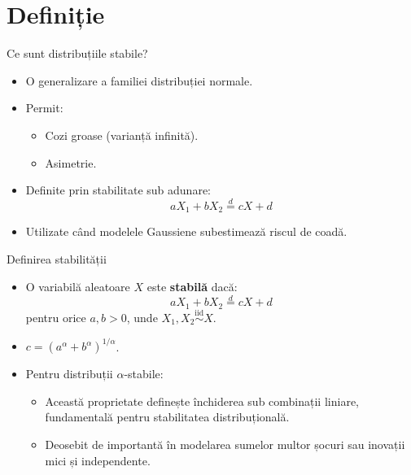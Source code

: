 \documentclass[9pt, aspectratio=169, t]{beamer}
\theoremstyle{definition}
\begin{document}
\section{Definiție}

\begin{frame}{Ce sunt distribuțiile stabile?}
\begin{itemize}
    \item O generalizare a familiei distribuției normale.
    \item Permit:
    \begin{itemize}
        \item Cozi groase (varianță infinită).
        \item Asimetrie.
    \end{itemize}
    \item Definite prin stabilitate sub adunare:
    \[
        aX_1 + bX_2 \stackrel{d}{=} cX + d
    \]
    \item Utilizate când modelele Gaussiene subestimează riscul de coadă.
\end{itemize}
\end{frame}

\begin{frame}{Definirea stabilității}
\begin{itemize}
    \item O variabilă aleatoare $X$ este \textbf{stabilă} dacă:
    \[
        aX_1 + bX_2 \stackrel{d}{=} cX + d
    \]
    pentru orice $a, b > 0$, unde $X_1, X_2 \stackrel{\text{iid}}{\sim} X$.
    \item $c = (a^\alpha + b^\alpha)^{1/\alpha}$.
    \item Pentru distribuții $\alpha$-stabile:
    \begin{itemize}
        \item Această proprietate definește închiderea sub combinații liniare, fundamentală pentru stabilitatea distribuțională.
        \item Deosebit de importantă în modelarea sumelor multor șocuri sau inovații mici și independente.
    \end{itemize}
\end{itemize}
\end{frame}
\end{document}
